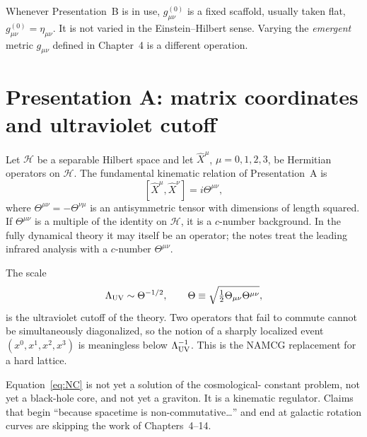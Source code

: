 \begin{assumption}
  \label{ass:aux-metric}
  Whenever Presentation~B is in use, \(g^{(0)}_{\mu\nu}\) is a fixed
  scaffold, usually taken flat,
  \(g^{(0)}_{\mu\nu}=\eta_{\mu\nu}\). It is not varied in the
  Einstein--Hilbert sense. Varying the \emph{emergent} metric
  \(g_{\mu\nu}\) defined in Chapter~4 is a different operation.
\end{assumption}

\section{Presentation A: matrix coordinates and ultraviolet cutoff}
\label{sec:ch3-matrices}

\begin{definition}
  \label{def:matrix-coords}
  Let \(\mathcal{H}\) be a separable Hilbert space and let
  \(\hat X^\mu\), \(\mu=0,1,2,3\), be Hermitian operators on
  \(\mathcal{H}\). The fundamental kinematic relation of Presentation~A
  is
  \begin{equation}
    \label{eq:NC}
    [\hat X^\mu,\hat X^\nu]=i\Theta^{\mu\nu},
  \end{equation}
  where \(\Theta^{\mu\nu}=-\Theta^{\nu\mu}\) is an antisymmetric
  tensor with dimensions of length squared. If \(\Theta^{\mu\nu}\) is
  a multiple of the identity on \(\mathcal{H}\), it is a
  \(c\)-number background. In the fully dynamical theory it may
  itself be an operator; the notes treat the leading infrared
  analysis with a \(c\)-number \(\Theta^{\mu\nu}\).
\end{definition}

The scale
\begin{equation}
  \label{eq:LUV-def}
  \Lambda_{\mathrm{UV}}\sim\Theta^{-1/2},
  \qquad
  \Theta
  \equiv
  \sqrt{\tfrac12\Theta_{\mu\nu}\Theta^{\mu\nu}},
\end{equation}
is the ultraviolet cutoff of the theory. Two operators that fail to
commute cannot be simultaneously diagonalized, so the notion of a
sharply localized event \((x^0,x^1,x^2,x^3)\) is meaningless below
\(\Lambda_{\mathrm{UV}}^{-1}\). This is the NAMCG replacement for a hard lattice.

\begin{remark}
  Equation~\eqref{eq:NC} is not yet a solution of the cosmological-
  constant problem, not yet a black-hole core, and not yet a graviton.
  It is a kinematic regulator. Claims that begin ``because spacetime
  is non-commutative\ldots'' and end at galactic rotation curves are
  skipping the work of Chapters~4--14.
\end{remark}

